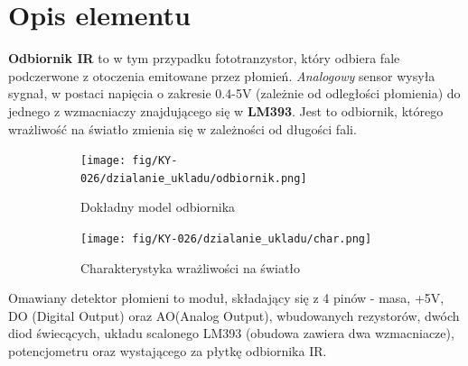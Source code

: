 \documentclass[11pt, a4paper]{article}
\author{Anna Nasierowska}
\begin{document}
\newpage

\section*{Opis elementu} 

\textbf{Odbiornik IR} to w tym przypadku fototranzystor, który odbiera fale podczerwone z otoczenia emitowane przez płomień. \textit{Analogowy} sensor wysyła sygnał, w postaci napięcia o zakresie 0.4-5V (zależnie od odległości płomienia) do jednego z wzmacniaczy znajdującego się w \textbf{LM393}. Jest to odbiornik, którego wrażliwość na światło zmienia się w zależności od długości fali. \\

\vspace{0.5cm}
\begin{figure}[h]
\centering
\begin{subfigure}{.5\textwidth}
  \centering
  \texttt{[image: fig/KY-026/dzialanie\_ukladu/odbiornik.png]} \caption{Dokładny model odbiornika}
  \label{fig:sub1}
\end{subfigure}%
\begin{subfigure}{.5\textwidth}
  \centering
    \texttt{[image: fig/KY-026/dzialanie\_ukladu/char.png]}
      \caption{Charakterystyka wrażliwości na światło}
  \label{zd}
\end{subfigure}
\caption{}
\label{fig:test}
\end{figure}
\vspace{0.5cm}

Omawiany detektor płomieni to moduł, składający się z 4 pinów - masa, +5V, DO (Digital Output) oraz AO(Analog Output), wbudowanych rezystorów, dwóch diod świecących, układu scalonego LM393 (obudowa zawiera dwa wzmacniacze), potencjometru oraz wystającego za płytkę odbiornika IR. 
\end{document}

